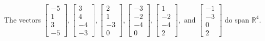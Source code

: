\begin{exercise}
\begin{exerciseStatement}
  \end{exerciseStatement}
  \begin{exerciseAnswer}
   The vectors \(\left[\begin{array}{r}
-5 \\
1 \\
3 \\
-5
\end{array}\right] , \left[\begin{array}{r}
3 \\
4 \\
-4 \\
-3
\end{array}\right] , \left[\begin{array}{r}
2 \\
1 \\
-3 \\
0
\end{array}\right] , \left[\begin{array}{r}
-3 \\
-2 \\
-4 \\
0
\end{array}\right] , \left[\begin{array}{r}
1 \\
-2 \\
-4 \\
2
\end{array}\right] , \text{ and } \left[\begin{array}{r}
-1 \\
-3 \\
0 \\
2
\end{array}\right]\) 
  	 do  
	span \(\mathbb{R}^4\).
  


  \end{exerciseAnswer}
\end{exercise}